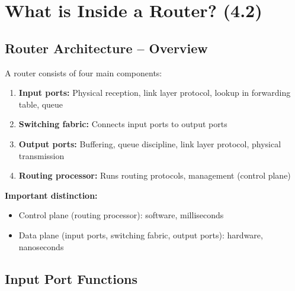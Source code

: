 \section{What is Inside a Router? (4.2)}

\subsection{Router Architecture -- Overview}

\begin{keybox}
A router consists of four main components:
\begin{enumerate}[noitemsep]
    \item \textbf{Input ports:} Physical reception, link layer protocol, lookup in forwarding table, queue
    \item \textbf{Switching fabric:} Connects input ports to output ports
    \item \textbf{Output ports:} Buffering, queue discipline, link layer protocol, physical transmission
    \item \textbf{Routing processor:} Runs routing protocols, management (control plane)
\end{enumerate}

\medskip
\textbf{Important distinction:}
\begin{itemize}[noitemsep]
    \item Control plane (routing processor): software, milliseconds
    \item Data plane (input ports, switching fabric, output ports): hardware, nanoseconds
\end{itemize}
\end{keybox}

\begin{imagebox}
\end{imagebox}

\subsection{Input Port Functions}

